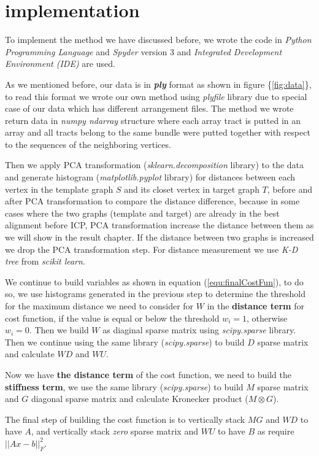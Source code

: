 \documentclass[../structure.tex]{subfiles}
\begin{document}
\chapter{implementation}
To implement the method we have discussed before, we wrote the code in \textit{Python Programming Language} and \textit{Spyder} version 3 and \textit{Integrated Development Environment (IDE)} are used.

As we mentioned before, our data is in \textit{\textbf{ply}} format as shown in figure \{\ref{fig:data}\}, to read this format we wrote our own method using \textit{plyfile} library due to special case of our data which has different arrangement files. The method we wrote return data in \textit{numpy ndarray} structure where each array tract is putted in an array and all tracts belong to the same bundle were putted together with respect to the sequences of the neighboring vertices.

Then we apply PCA transformation (\textit{sklearn.decomposition} library) to the data and generate histogram (\textit{matplotlib.pyplot} library) for distances between each vertex in the template graph $S$ and its closet vertex in target graph $T$, before and after PCA transformation to compare the distance difference, because in some cases where the two graphs (template and target) are already in the best alignment before ICP, PCA transformation increase the distance between them as we will show in the result chapter. If the distance between two graphs is increased we drop the PCA transformation step. For distance measurement we use \textit{K-D tree} from \textit{scikit learn}.

We continue to build variables as shown in equation (\ref{equ:finalCostFun}), to do so, we use histograms generated in the previous step to determine the threshold for the maximum distance we need to consider for $W$ in the \textbf{distance term} for cost function, if the value is equal or below the threshold $w_{i} = 1$, otherwise $w_{i} = 0$. Then we build $W$ as diaginal sparse matrix using \textit{scipy.sparse} library. Then we continue using the same library (\textit{scipy.sparse}) to build $D$ sparse matrix and calculate $WD$ and $WU$.

Now we have \textbf{the distance term} of the cost function, we need to build the \textbf{stiffness term}, we use the same library (\textit{scipy.sparse}) to build $M$ sparse matrix and $G$ diagonal sparse matrix and calculate Kronecker product ($M\otimes G$).

The final step of building the cost function is to vertically stack $MG$ and $WD$ to have $A$, and vertically stack \textit{zero} sparse matrix and $WU$ to have $B$ as require $||Ax-b||_{F}^2$.
\end{document}
